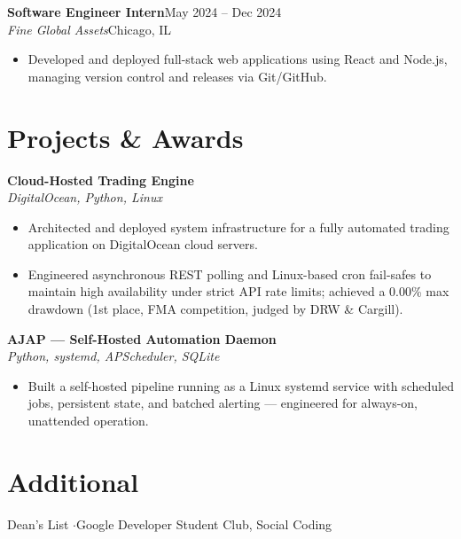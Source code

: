 \documentclass[letterpaper,10.5pt]{article}
\newcommand{\entry}[4]{\textbf{#1}\hfill{\small #2}\\\textit{\small #3}\hfill{\small #4}\par\vspace{1pt}}
\begin{document}
\entry{Software Engineer Intern}{May 2024 -- Dec 2024}{Fine Global Assets}{Chicago, IL}
\begin{itemize}
  \item Developed and deployed full-stack web applications using React and Node.js, managing version control and releases via Git/GitHub.
\end{itemize}

\section{Projects \& Awards}
\entry{Cloud-Hosted Trading Engine}{}{DigitalOcean, Python, Linux}{}
\begin{itemize}
  \item Architected and deployed system infrastructure for a fully automated trading application on DigitalOcean cloud servers.
  \item Engineered asynchronous REST polling and Linux-based cron fail-safes to maintain high availability under strict API rate limits; achieved a 0.00\% max drawdown (1st place, FMA competition, judged by DRW \& Cargill).
\end{itemize}

\entry{AJAP --- Self-Hosted Automation Daemon}{}{Python, systemd, APScheduler, SQLite}{}
\begin{itemize}
  \item Built a self-hosted pipeline running as a Linux systemd service with scheduled jobs, persistent state, and batched alerting --- engineered for always-on, unattended operation.
\end{itemize}

\section{Additional}
{\small Dean's List \quad$\cdot$\quad Google Developer Student Club, Social Coding}
\end{document}
